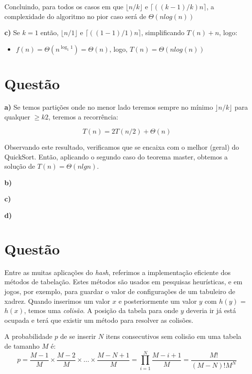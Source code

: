 \documentclass[a4paper,12pt]{article}
\begin{document}
\begin{description}
	Concluindo, para todos os casos em que $\lfloor n/k \rfloor$ e $\lceil ((k-1)/k)n \rceil$, a complexidade do algoritmo no pior caso será de $\Theta (n log(n))$ 

	\item{\textbf{c)}} Se $k=1$ então, $\lfloor n/1 \rfloor$ e $\lceil ((1-1)/1)n \rceil$, simplificando $T(n)+n$, logo:
	\begin{itemize}
		\item $f(n) = \Theta(n^{\log_1 1}) = \Theta(n)$, logo, $T(n) = \Theta(nlog(n))$
	\end{itemize}
\end{description}

\section{Questão}
\begin{description}
  \item{\textbf{a)}} Se temos partições onde no menor lado teremos sempre no mínimo $\rfloor n/k \rfloor$ para qualquer $\geq k 2$, teremos a recorrência:
  	
 $$T(n) = 2T(n/2) + \Theta(n)$$

 Observando este resultado, verificamos que se encaixa com o melhor (geral) do QuickSort. Então, aplicando o segundo caso do teorema master, obtemos a solução de $T(n) = \Theta(n lg n)$.

	\item{\textbf{b)}}
	\item{\textbf{c)}}
	\item{\textbf{d)}}
\end{description}

\section{Questão}
Entre as muitas aplicações do \textit{hash}, referimos a implementação eficiente dos métodos de tabelação. Estes métodos são usados em pesquisas heurísticas, e em jogos, por exemplo, para guardar o valor de configurações de um tabuleiro de xadrez.
Quando inserimos um valor $x$ e posteriormente um valor $y$ com $h(y)$ = $h(x)$, temos uma \textit{colisão}. A posição da tabela para onde $y$ deveria ir já está ocupada e terá que existir um método para resolver as colisões.

A probabilidade $p$ de se inserir $N$ itens consecutivos sem colisão em uma tabela de tamanho $M$ é:
	$$
	p = \frac{M-1}{M}\times\frac{M-2}{M}\times...\times\frac{M-N+1}{M} = \prod \limits_{i=1}^N \frac{M-i+1}{M} = \frac{M!}{(M-N)!M^N}
	$$
\end{document}
